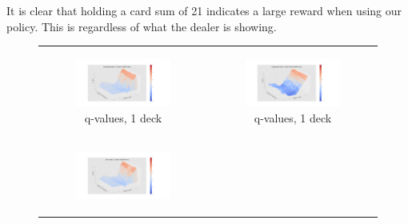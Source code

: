 It is clear that holding a card sum of 21 indicates a large reward when using our policy. This is regardless of what the dealer is showing.
\begin{landscape}
\begin{figure}[htp]
\begin{tabular}{cc}
\centering
\begin{subfigure}[b]{1\textwidth}
  	 \includegraphics[width=\textwidth]{./figures/ace_3D_exp_1_decks.png}
   \caption{q-values, 1 deck\label{sfig:3Dnd1}}
\end{subfigure}\hspace{-4cm}
&
\begin{subfigure}[b]{1\textwidth}
  	 \includegraphics[width=\textwidth]{./figures/noace_3D_exp_1_decks.png}
   \caption{q-values, 1 deck\label{sfig:3Dnd2}}
\end{subfigure} \\
\begin{subfigure}[b]{1\textwidth}
  	 \includegraphics[width=\textwidth]{./figures/ace_3D_sum_1_decks.png}

\end{subfigure}
\end{tabular}
\end{figure}
\end{landscape}
